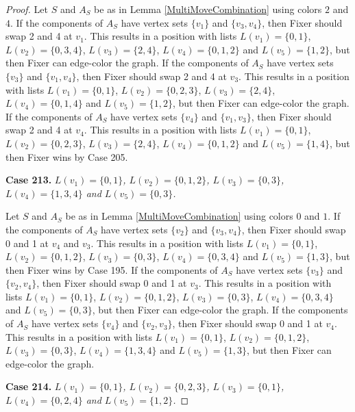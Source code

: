 \documentclass[12pt]{amsart}
\theoremstyle{plain}
\theoremstyle{definition}
\theoremstyle{remark}
\begin{document}
\begin{proof}
Let $S$ and $A_S$ be as in Lemma \ref{MultiMoveCombination} using colors $2$ and $4$. If the components of $A_S$ have vertex sets $\{v_1\}$ and $\{v_3, v_4\}$, then Fixer should swap 2 and 4 at $v_1$. This results in a position with lists $L(v_1) = \{0, 1\}$, $L(v_2) = \{0, 3, 4\}$, $L(v_3) = \{2, 4\}$, $L(v_4) = \{0, 1, 2\}$ and $L(v_5) = \{1, 2\}$, but then Fixer can edge-color the graph.
If the components of $A_S$ have vertex sets $\{v_3\}$ and $\{v_1, v_4\}$, then Fixer should swap 2 and 4 at $v_3$. This results in a position with lists $L(v_1) = \{0, 1\}$, $L(v_2) = \{0, 2, 3\}$, $L(v_3) = \{2, 4\}$, $L(v_4) = \{0, 1, 4\}$ and $L(v_5) = \{1, 2\}$, but then Fixer can edge-color the graph.
If the components of $A_S$ have vertex sets $\{v_4\}$ and $\{v_1, v_3\}$, then Fixer should swap 2 and 4 at $v_4$. This results in a position with lists $L(v_1) = \{0, 1\}$, $L(v_2) = \{0, 2, 3\}$, $L(v_3) = \{2, 4\}$, $L(v_4) = \{0, 1, 2\}$ and $L(v_5) = \{1, 4\}$, but then Fixer wins by Case 205.

\noindent\textbf{Case 213.  }\textit{$L(v_1) = \{0, 1\}$, $L(v_2) = \{0, 1, 2\}$, $L(v_3) = \{0, 3\}$, $L(v_4) = \{1, 3, 4\}$ and $L(v_5) = \{0, 3\}$.}

Let $S$ and $A_S$ be as in Lemma \ref{MultiMoveCombination} using colors $0$ and $1$. If the components of $A_S$ have vertex sets $\{v_2\}$ and $\{v_3, v_4\}$, then Fixer should swap 0 and 1 at $v_4$ and $v_3$. This results in a position with lists $L(v_1) = \{0, 1\}$, $L(v_2) = \{0, 1, 2\}$, $L(v_3) = \{0, 3\}$, $L(v_4) = \{0, 3, 4\}$ and $L(v_5) = \{1, 3\}$, but then Fixer wins by Case 195.
If the components of $A_S$ have vertex sets $\{v_3\}$ and $\{v_2, v_4\}$, then Fixer should swap 0 and 1 at $v_3$. This results in a position with lists $L(v_1) = \{0, 1\}$, $L(v_2) = \{0, 1, 2\}$, $L(v_3) = \{0, 3\}$, $L(v_4) = \{0, 3, 4\}$ and $L(v_5) = \{0, 3\}$, but then Fixer can edge-color the graph.
If the components of $A_S$ have vertex sets $\{v_4\}$ and $\{v_2, v_3\}$, then Fixer should swap 0 and 1 at $v_4$. This results in a position with lists $L(v_1) = \{0, 1\}$, $L(v_2) = \{0, 1, 2\}$, $L(v_3) = \{0, 3\}$, $L(v_4) = \{1, 3, 4\}$ and $L(v_5) = \{1, 3\}$, but then Fixer can edge-color the graph.

\noindent\textbf{Case 214.  }\textit{$L(v_1) = \{0, 1\}$, $L(v_2) = \{0, 2, 3\}$, $L(v_3) = \{0, 1\}$, $L(v_4) = \{0, 2, 4\}$ and $L(v_5) = \{1, 2\}$.}


\end{proof}
\end{document}
